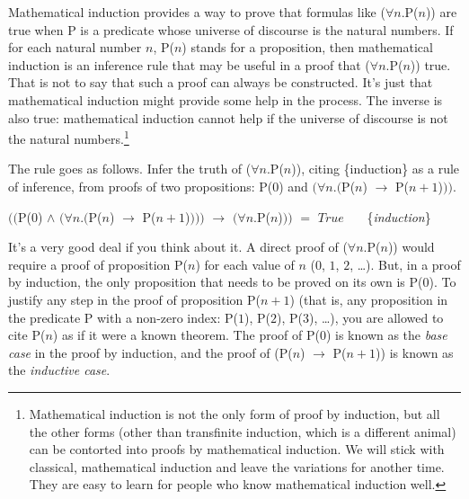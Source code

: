 Mathematical induction
provides a way to prove that
formulas like ($\forall$$n$.P($n$)) are true
when P is a predicate whose universe of discourse is the natural numbers.
If for each natural number $n$, P($n$) stands for a proposition,
then mathematical induction is an inference rule that may be useful
in a proof that ($\forall$$n$.P($n$)) true.
That is not to say that such a proof can always be constructed.
It's just that mathematical induction might provide some help in the process.
The inverse is also true: mathematical induction cannot help
if the universe of discourse is not the natural numbers.\footnote{Mathematical
induction is not the only form
of proof by induction, but all the other forms
(other than transfinite induction, which is a different animal)
can be contorted into proofs by mathematical induction.
We will stick with classical, mathematical induction
and leave the variations for another time.
They are easy to learn for people who know mathematical induction well.}

The rule goes as follows. Infer the truth of ($\forall$$n$.P($n$)),
citing \{induction\} as a rule of inference,
from proofs of two propositions:
P(0) and $(\forall n.($P($n$) $\rightarrow$ P($n+1$)$))$.

\begin{center}
$(($P($0$) $\wedge$ $(\forall n.($P($n$) $\rightarrow$ P($n+1$)$)))$ $\rightarrow$ $(\forall n.$P($n$)$))$ $=$ $True$
~~~\{\emph{induction}\}
\end{center}

It's a very good deal if you think about it.
A direct proof of ($\forall$$n$.P($n$)) would require a proof of proposition P($n$)
for each value of $n$ ($0$, $1$, $2$, \dots).
But, in a proof by induction,
the only proposition that needs to be proved on its own is P($0$).
To justify any step in the proof of proposition P($n+1$)
(that is, any proposition in the predicate P with a non-zero index:
P($1$), P($2$), P($3$), \dots),
you are allowed to cite P($n$) as if it were a known theorem.
The proof of P($0$) is known as the
\emph{base case}
in the proof by induction,
and the proof of (P($n$) $\rightarrow$ P($n+1$)) is known as the
\emph{inductive case}.

